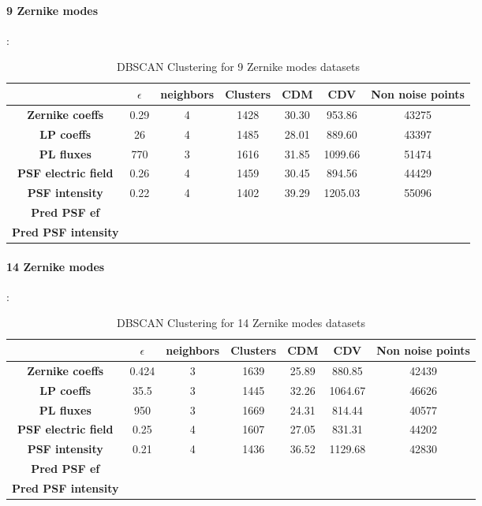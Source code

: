 		\paragraph{9 Zernike modes}:
		\begin{table}[h!]
			\centering
			\begin{tabular}{|c|c|c|c|c|c|c|}
				\hline
				\textbf{} & \textbf{$\epsilon$} & \textbf{neighbors} & \textbf{Clusters} & \textbf{CDM} & \textbf{CDV} & \textbf{Non noise points}\\
				\hline
				\textbf{Zernike coeffs} & 0.29 & 4 & 1428 & 30.30 & 953.86 & 43275 \\
				\hline
				\textbf{LP coeffs} & 26 & 4 & 1485 & 28.01 & 889.60 & 43397 \\
				\hline
				\textbf{PL fluxes} & 770 & 3 & 1616 & 31.85 & 1099.66 & 51474 \\
				\hline
				\textbf{PSF electric field} & 0.26 & 4 & 1459 & 30.45 & 894.56 & 44429 \\
				\hline
				\textbf{PSF intensity} & 0.22 & 4 & 1402 & 39.29 & 1205.03 & 55096 \\
				\hline
				\textbf{Pred PSF ef} &  &  &  &  &  &  \\
				\hline
				\textbf{Pred PSF intensity} &  &  &  &  &  &  \\
				\hline
			\end{tabular}
		\caption{DBSCAN Clustering for 9 Zernike modes datasets}
		\end{table}
		\FloatBarrier
		
		\paragraph{14 Zernike modes}:
		\begin{table}[h!]
			\centering
			\begin{tabular}{|c|c|c|c|c|c|c|}
				\hline
				\textbf{} & \textbf{$\epsilon$} & \textbf{neighbors} & \textbf{Clusters} & \textbf{CDM} & \textbf{CDV} & \textbf{Non noise points}\\
				\hline
				\textbf{Zernike coeffs} & 0.424 & 3 & 1639 & 25.89 & 880.85 & 42439 \\
				\hline
				\textbf{LP coeffs} & 35.5 & 3 & 1445 & 32.26 & 1064.67 & 46626 \\
				\hline
				\textbf{PL fluxes} & 950 & 3 & 1669 & 24.31 & 814.44 & 40577 \\
				\hline
				\textbf{PSF electric field} & 0.25 & 4 & 1607 & 27.05 & 831.31 & 44202 \\
				\hline
				\textbf{PSF intensity} & 0.21 & 4 & 1436 & 36.52 & 1129.68 & 42830 \\
				\hline
				\textbf{Pred PSF ef} &  &  &  &  &  &  \\
				\hline
				\textbf{Pred PSF intensity} &  &  &  &  &  &  \\
				\hline
			\end{tabular}
		\caption{DBSCAN Clustering for 14 Zernike modes datasets}
		\end{table}
		\FloatBarrier
		
